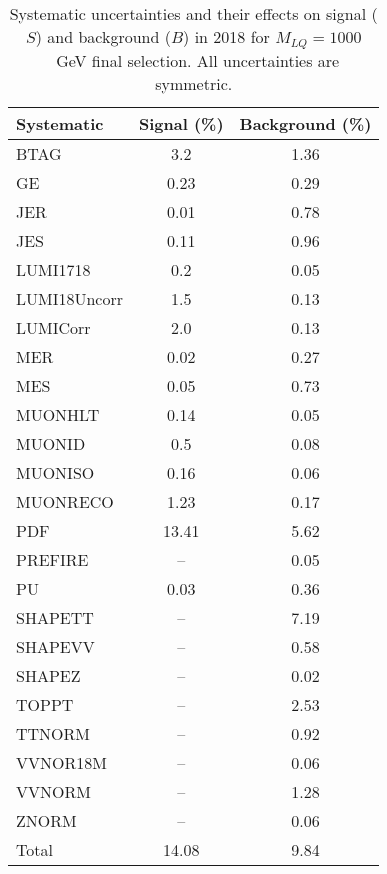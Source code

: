 \begin{table}[htbp]
\begin{center}
\caption{Systematic uncertainties and their effects on signal ($S$) and background ($B$) in 2018 for $M_{LQ}=1000$~GeV final selection. All uncertainties are symmetric.}
\begin{tabular}{lcc}
\hline\hline
Systematic & Signal (\%) & Background (\%) \\ \hline 
BTAG & 3.2 & 1.36\\ 
GE & 0.23 & 0.29\\ 
JER & 0.01 & 0.78\\ 
JES & 0.11 & 0.96\\ 
LUMI1718 & 0.2 & 0.05\\ 
LUMI18Uncorr & 1.5 & 0.13\\ 
LUMICorr & 2.0 & 0.13\\ 
MER & 0.02 & 0.27\\ 
MES & 0.05 & 0.73\\ 
MUONHLT & 0.14 & 0.05\\ 
MUONID & 0.5 & 0.08\\ 
MUONISO & 0.16 & 0.06\\ 
MUONRECO & 1.23 & 0.17\\ 
PDF & 13.41 & 5.62\\ 
PREFIRE & -- & 0.05\\ 
PU & 0.03 & 0.36\\ 
SHAPETT & -- & 7.19\\ 
SHAPEVV & -- & 0.58\\ 
SHAPEZ & -- & 0.02\\ 
TOPPT & -- & 2.53\\ 
TTNORM & -- & 0.92\\ 
VVNOR18M & -- & 0.06\\ 
VVNORM & -- & 1.28\\ 
ZNORM & -- & 0.06\\ 
Total & 14.08 & 9.84\\ \hline \hline
\end{tabular}
\label{tab:SysUncertainties_uujj_1000}
\end{center}
\end{table}

